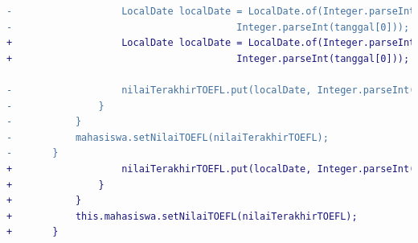\begin{itemize}
\begin{lstlisting}[language=diff, caption=Perubahan Implementasi Jsoup TOEFL, label=diff_toefl]
-                   LocalDate localDate = LocalDate.of(Integer.parseInt(tanggal[2]), Integer.parseInt(tanggal[1]),
-                                       Integer.parseInt(tanggal[0]));
+                   LocalDate localDate = LocalDate.of(Integer.parseInt(tanggal[2]), Integer.parseInt(tanggal[1]),
+                                       Integer.parseInt(tanggal[0]));

-                   nilaiTerakhirTOEFL.put(localDate, Integer.parseInt(nilai.text()));
-               }
-           }
-           mahasiswa.setNilaiTOEFL(nilaiTerakhirTOEFL);
-       }
+                   nilaiTerakhirTOEFL.put(localDate, Integer.parseInt(nilai.text()));
+               }
+           }
+           this.mahasiswa.setNilaiTOEFL(nilaiTerakhirTOEFL);
+       }
        \end{lstlisting}

    \end{itemize}

